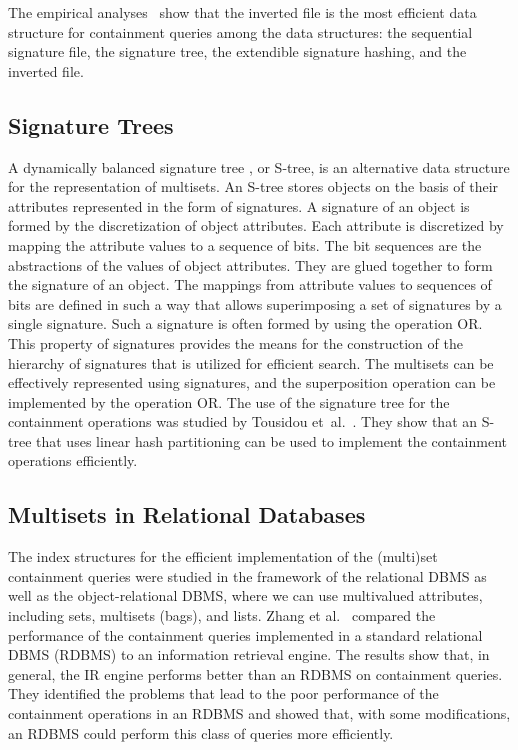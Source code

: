 \documentclass[algorithms,article,accept,pdftex,moreauthors]{Definitions/mdpi}
\begin{document}
The empirical analyses~\cite{Helmer2003,zobel1998inverted} show that the inverted file is the most efficient data structure for containment queries among the data structures: the sequential signature file, the signature tree, the extendible signature hashing, and the inverted file. 


\subsection{Signature Trees\label{rel-signature}}

A dynamically balanced signature tree \cite{Deppisch1986,Pfaltz1980}, or S-tree, is an alternative data structure for the representation of multisets. An S-tree stores objects on the basis of their attributes represented in the form of signatures. A signature of an object is formed by the discretization of object attributes. Each attribute is discretized by mapping the attribute values to a sequence of bits. The bit sequences are the abstractions of the values of object attributes. They are glued together to form the signature of an object. The mappings from attribute values to sequences of bits are defined in such a way that allows superimposing a set of signatures by a single signature. Such a signature is often formed by using the operation OR. This property of signatures provides the means for the construction of the hierarchy of signatures that is utilized for efficient search. The multisets can be effectively represented using signatures, and the superposition operation can be implemented by the operation OR. The use of the signature tree for the containment operations was studied by Tousidou et~al.~\cite{tousidou2002sigstruc}. They show that an S-tree that uses linear hash partitioning can be used to implement the containment operations efficiently. 

\subsection{Multisets in Relational Databases\label{rel-dbms}}

The index structures for the efficient implementation of the (multi)set containment queries were studied in the framework of the relational DBMS as well as the object-relational DBMS, where we can use multivalued attributes, including sets, multisets (bags), and lists. Zhang et al.\ \cite{Zhang2001} compared the performance of the containment queries implemented in a standard relational DBMS (RDBMS) to an information retrieval engine. The results show that, in general, the IR engine performs better than an RDBMS on containment queries. They identified the problems that lead to the poor performance of the containment operations in an RDBMS and showed that, with some modifications, an RDBMS could perform this class of queries more efficiently. 
\end{document}
